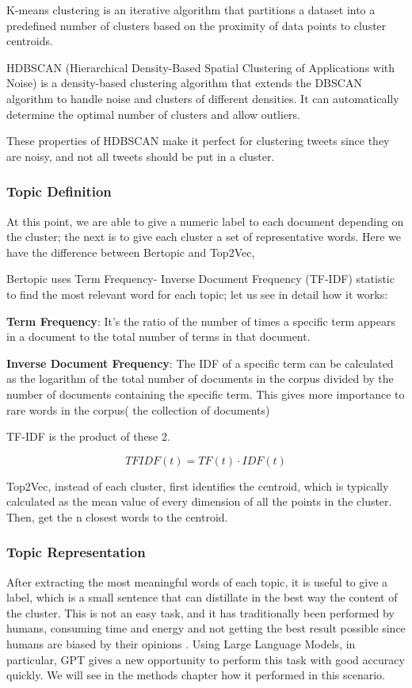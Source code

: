 K-means clustering \cite{jin_k-means_2010} is an iterative algorithm that partitions a dataset into a predefined number of clusters based on the proximity of data points to cluster centroids.

HDBSCAN  \cite{mcinnes_hdbscan_2017}(Hierarchical Density-Based Spatial Clustering of Applications with Noise) is a density-based clustering algorithm that extends the DBSCAN algorithm to handle noise and clusters of different densities. It can automatically determine the optimal number of clusters and allow outliers.

These properties of HDBSCAN make it perfect for clustering tweets since they are noisy, and not all tweets should be put in a cluster.

\subsubsection{Topic Definition}
At this point, we are able to give a numeric label to each document depending on the cluster; the next is to give each cluster a set of representative words.
 Here we have the difference between Bertopic and Top2Vec,

Bertopic uses Term Frequency- Inverse Document Frequency (TF-IDF) \cite{rajaraman_data_2011}  statistic to find the most relevant word for each topic; let us see in detail how it works:

\textbf{Term Frequency}: It's the ratio of the number of times a specific term appears in a document to the total number of terms in that document.

\textbf{Inverse Document Frequency}: The IDF of a specific term can be calculated as the logarithm of the total number of documents in the corpus divided by the number of documents containing the specific term. This gives more importance to rare words in the corpus( the collection of documents) 

TF-IDF is the product of these 2.

\begin{equation}
    TFIDF(t) = TF(t) \cdot IDF(t)
\end{equation}



Top2Vec, instead of each cluster, first identifies the centroid, which is typically calculated as the mean value of every dimension of all the points in the cluster. Then, get the n closest words to the centroid.


\subsubsection{Topic Representation}
After extracting the most meaningful words of each topic, it is useful to give a label, which is a small sentence that can distillate in the best way the content of the cluster. This is not an easy task, and it has traditionally been performed by humans,  consuming time and energy and not getting the best result possible since humans are biased by their opinions  \cite{misra_seeing_2016} \cite{haliburton_investigating_2023}. Using Large Language Models, in particular, GPT gives a new opportunity to perform this task with good accuracy quickly. We will see in the methods chapter how it performed in this scenario.


